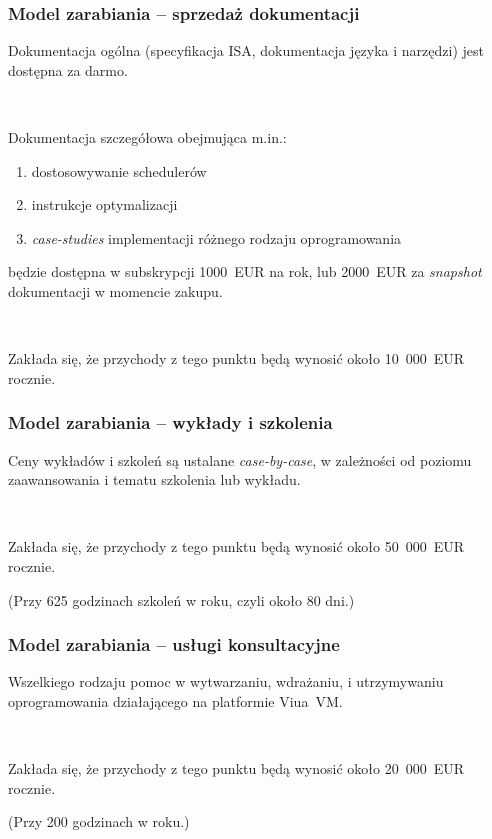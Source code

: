 \documentclass[aspectratio=169]{beamer}
\begin{document}
\begin{frame}
    \frametitle{Model zarabiania -- sprzedaż dokumentacji}

    Dokumentacja ogólna (specyfikacja ISA, dokumentacja języka i narzędzi) jest
    dostępna za darmo.

    ~

    Dokumentacja szczegółowa obejmująca m.in.:

    \begin{enumerate}
        \item dostosowywanie schedulerów
        \item instrukcje optymalizacji
        \item \emph{case-studies} implementacji różnego rodzaju oprogramowania
    \end{enumerate}

    będzie dostępna w subskrypcji 1000~EUR na rok, lub 2000~EUR za
    \emph{snapshot} dokumentacji w momencie zakupu.

    ~

    Zakłada się, że przychody z tego punktu będą wynosić około 10~000~EUR rocznie.
\end{frame}

\begin{frame}
    \frametitle{Model zarabiania -- wykłady i szkolenia}

    Ceny wykładów i szkoleń są ustalane \emph{case-by-case}, w zależności od
    poziomu zaawansowania i tematu szkolenia lub wykładu.

    ~

    Zakłada się, że przychody z tego punktu będą wynosić około 50~000~EUR rocznie.
    \newline
    \begin{tiny}
        (Przy 625 godzinach szkoleń w roku, czyli około 80 dni.)
    \end{tiny}
\end{frame}

\begin{frame}
    \frametitle{Model zarabiania -- usługi konsultacyjne}

    Wszelkiego rodzaju pomoc w wytwarzaniu, wdrażaniu, i utrzymywaniu
    oprogramowania działającego na platformie Viua~VM.

    ~

    Zakłada się, że przychody z tego punktu będą wynosić około 20~000~EUR
    rocznie.
    \newline
    \begin{tiny}
        (Przy 200 godzinach w roku.)
    \end{tiny}
\end{frame}
\end{document}
